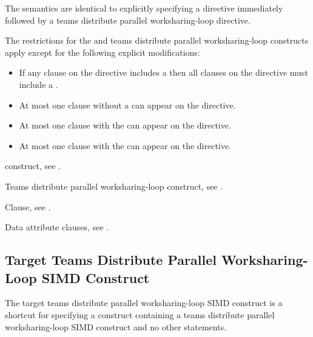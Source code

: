 \descr
The semantics are identical to explicitly specifying a 
directive immediately followed by a teams distribute parallel worksharing-loop 
directive.

\restrictions
The restrictions for the  and teams distribute parallel
worksharing-loop constructs apply except for the following explicit modifications:

\begin{itemize}
\item If any  clause on the directive includes a
       then all  clauses
      on the directive must include a .
\item At most one  clause without a
       can appear on the directive.
\item At most one  clause with the 
       can appear on the directive.
\item At most one  clause with the 
       can appear on the directive.
\end{itemize}

\begin{crossrefs}
\item {} construct, see .

\item Teams distribute parallel worksharing-loop construct, see
.

\item {} Clause, see .

\item Data attribute clauses, see
.
\end{crossrefs}



\subsection{Target Teams Distribute Parallel Worksharing-Loop SIMD Construct}
\label{subsec:Target Teams Distribute Parallel Loop SIMD Construct}
\summary
The target teams distribute parallel worksharing-loop SIMD construct is a shortcut 
for specifying a  construct containing a teams distribute parallel 
worksharing-loop SIMD construct and no other statements.

